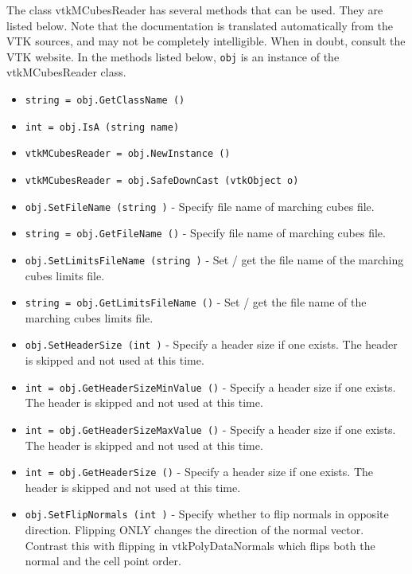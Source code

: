 The class vtkMCubesReader has several methods that can be used.
  They are listed below.
Note that the documentation is translated automatically from the VTK sources,
and may not be completely intelligible.  When in doubt, consult the VTK website.
In the methods listed below, \verb|obj| is an instance of the vtkMCubesReader class.
\begin{itemize}
\item  \verb|string = obj.GetClassName ()|

\item  \verb|int = obj.IsA (string name)|

\item  \verb|vtkMCubesReader = obj.NewInstance ()|

\item  \verb|vtkMCubesReader = obj.SafeDownCast (vtkObject o)|

\item  \verb|obj.SetFileName (string )| -  Specify file name of marching cubes file.

\item  \verb|string = obj.GetFileName ()| -  Specify file name of marching cubes file.

\item  \verb|obj.SetLimitsFileName (string )| -  Set / get the file name of the marching cubes limits file.

\item  \verb|string = obj.GetLimitsFileName ()| -  Set / get the file name of the marching cubes limits file.

\item  \verb|obj.SetHeaderSize (int )| -  Specify a header size if one exists. The header is skipped and not used at this time.

\item  \verb|int = obj.GetHeaderSizeMinValue ()| -  Specify a header size if one exists. The header is skipped and not used at this time.

\item  \verb|int = obj.GetHeaderSizeMaxValue ()| -  Specify a header size if one exists. The header is skipped and not used at this time.

\item  \verb|int = obj.GetHeaderSize ()| -  Specify a header size if one exists. The header is skipped and not used at this time.

\item  \verb|obj.SetFlipNormals (int )| -  Specify whether to flip normals in opposite direction. Flipping ONLY
 changes the direction of the normal vector. Contrast this with flipping
 in vtkPolyDataNormals which flips both the normal and the cell point
 order.


\end{itemize}
